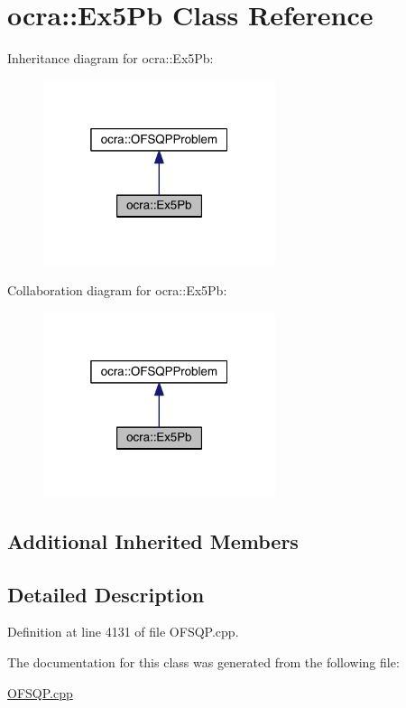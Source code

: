\hypertarget{classocra_1_1Ex5Pb}{}\section{ocra\+:\+:Ex5\+Pb Class Reference}
\label{classocra_1_1Ex5Pb}


Inheritance diagram for ocra\+:\+:Ex5\+Pb\+:\nopagebreak
\begin{figure}[H]
\begin{center}
\leavevmode
\includegraphics[width=193pt]{d9/d23/classocra_1_1Ex5Pb__inherit__graph}
\end{center}
\end{figure}


Collaboration diagram for ocra\+:\+:Ex5\+Pb\+:\nopagebreak
\begin{figure}[H]
\begin{center}
\leavevmode
\includegraphics[width=193pt]{d1/dc8/classocra_1_1Ex5Pb__coll__graph}
\end{center}
\end{figure}
\subsection*{Additional Inherited Members}


\subsection{Detailed Description}


Definition at line 4131 of file O\+F\+S\+Q\+P.\+cpp.



The documentation for this class was generated from the following file\+:\begin{DoxyCompactItemize}
\item 
\hyperlink{OFSQP_8cpp}{O\+F\+S\+Q\+P.\+cpp}\end{DoxyCompactItemize}
